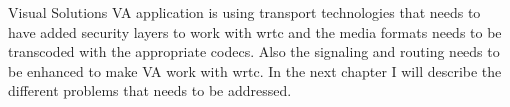 Visual Solutions VA application is using transport technologies that needs to have added security layers to work with \gls{wrtc} and the media formats needs to be transcoded with the appropriate codecs. Also the signaling and routing needs to be enhanced to make VA work with \gls{wrtc}. In the next chapter I will describe the different problems that needs to be addressed.

